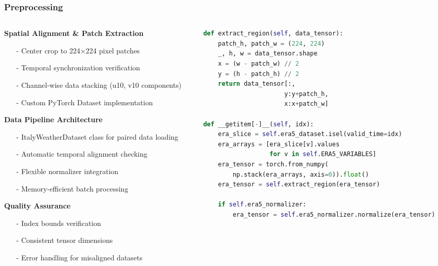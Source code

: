 \documentclass[footline=authortitle]{beamer}
\begin{document}
\begin{frame}[fragile]
\frametitle{Preprocessing}
\scriptsize
\begin{columns}
    \begin{column}{0.55\textwidth}
        \textbf{Spatial Alignment \& Patch Extraction}
        \begin{itemize}
            \item[-] Center crop to 224×224 pixel patches
            \item[-] Temporal synchronization verification
            \item[-] Channel-wise data stacking (u10, v10 components)
            \item[-] Custom PyTorch Dataset implementation
        \end{itemize}

        \textbf{Data Pipeline Architecture}
        \begin{itemize}
            \item[-] ItalyWeatherDataset class for paired data loading
            \item[-] Automatic temporal alignment checking
            \item[-] Flexible normalizer integration
            \item[-] Memory-efficient batch processing
        \end{itemize}

        \textbf{Quality Assurance}
        \begin{itemize}
            \item[-] Index bounds verification
            \item[-] Consistent tensor dimensions
            \item[-] Error handling for misaligned datasets
        \end{itemize}
    \end{column}

    \begin{column}{0.45\textwidth}
        \begin{lstlisting}[language=Python, basicstyle=\ttfamily\tiny]
def extract_region(self, data_tensor):
    patch_h, patch_w = (224, 224)
    _, h, w = data_tensor.shape
    x = (w - patch_w) // 2
    y = (h - patch_h) // 2
    return data_tensor[:, 
                      y:y+patch_h, 
                      x:x+patch_w]

def __getitem[-]__(self, idx):
    era_slice = self.era5_dataset.isel(valid_time=idx)
    era_arrays = [era_slice[v].values 
                  for v in self.ERA5_VARIABLES]
    era_tensor = torch.from_numpy(
        np.stack(era_arrays, axis=0)).float()
    era_tensor = self.extract_region(era_tensor)

    if self.era5_normalizer:
        era_tensor = self.era5_normalizer.normalize(era_tensor)
        \end{lstlisting}
    \end{column}
\end{columns}
\end{frame}
\end{document}
